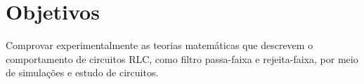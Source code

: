 \newpage
\section{Objetivos}
Comprovar experimentalmente as teorias matemáticas que descrevem o comportamento de circuitos RLC, como filtro passa-faixa e rejeita-faixa, por meio de simulações e estudo de circuitos.
\pagebreak